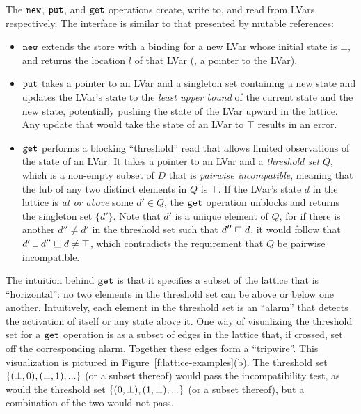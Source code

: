 

The $\mbox{\texttt{new}}$, $\mbox{\texttt{put}}$, and $\mbox{\texttt{get}}$ operations create, write to, and read
from LVars, respectively.  The interface is similar to that presented
by mutable references:

\begin{itemize}
\item $\mbox{\texttt{new}}$ extends the store with a binding for a new LVar whose
  initial state is $\bot$, and returns the location $l$ of that LVar
  (\ie, a pointer to the LVar).
\item $\mbox{\texttt{put}}$ takes a pointer to an LVar and a singleton set containing
  a new state and updates the LVar's state to the {\em least upper bound} of the current state and the new state,
  potentially pushing the state of the LVar upward in the
  lattice.  Any update that would take the state of an LVar to $\top$
  results in an error.
\item $\mbox{\texttt{get}}$ performs a blocking ``threshold'' read that allows
  limited observations of the state of an LVar.  It takes a pointer to
  an LVar and a \emph{threshold set} $Q$, which is a non-empty subset
  of $D$ that is \emph{pairwise incompatible}, meaning that the lub of
  any two distinct elements in $Q$ is $\top$.  If the LVar's state $d$
  in the lattice is {\em at or above} some $d' \in Q$, the $\mbox{\texttt{get}}$
  operation unblocks and returns the singleton set $\lbrace d'
  \rbrace$.  Note that $d'$ is a unique element of $Q$, for if there
  is another $d'' \neq d'$ in the threshold set such that $d'' \sqsubseteq
  d$, it would follow that $d' \sqcup d'' \sqsubseteq d \neq \top$, which
  contradicts the requirement that $Q$ be pairwise incompatible.
\end{itemize}

\noindent The intuition behind $\mbox{\texttt{get}}$ is that
it specifies a subset of the lattice that is ``horizontal'': no two
elements in the threshold set can be above or below one another.  
Intuitively, each element in the threshold set is an
``alarm'' that detects the activation of itself or any state
above it.  One way of visualizing the threshold set for a $\mbox{\texttt{get}}$ operation
is as a subset of edges in the lattice that, if crossed, set off the
corresponding alarm.  Together these edges form a ``tripwire''.  This
visualization is pictured in Figure~\ref{f:lattice-examples}(b).  The
threshold set $\lbrace (\bot, 0), (\bot, 1), ... \rbrace$ (or a subset thereof)
would pass the incompatibility test, as would the threshold set
$\lbrace (0, \bot), (1, \bot), ... \rbrace$ (or a subset thereof), but a
combination of the two would not pass.

